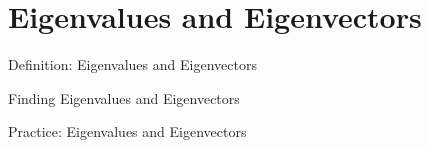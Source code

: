 \section{Eigenvalues and Eigenvectors}

\begin{frame}{Definition: Eigenvalues and Eigenvectors}

\end{frame}

\begin{frame}{Finding Eigenvalues and Eigenvectors}

\end{frame}

\begin{frame}{Practice: Eigenvalues and Eigenvectors}

\end{frame}

